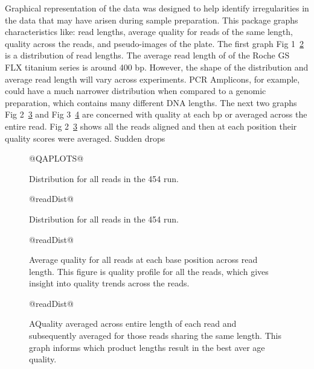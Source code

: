 \documentclass[11pt]{article}
\begin{document}
Graphical representation of the data was designed to help identify irregularities in the data that may have arisen during sample preparation.  This package graphs characteristics like: read lengths, average quality for reads of the same length, quality across the reads, and pseudo-images of the plate.
The first graph Fig 1~\ref{fig:01} is a distribution of read lengths.  The average read length of of the Roche GS FLX titanium series is around 400 bp.  However, the shape of the distribution and average read length will vary across experiments.  PCR Amplicons, for example, could have a much narrower distribution when compared to a genomic preparation, which contains many different DNA lengths.  The next two graphs Fig 2~\ref{fig:02} and Fig 3~\ref{fig:03} are concerned with quality at each bp or averaged across the entire read.  Fig 2~\ref{fig:02} shows all the reads aligned and then at each position their quality scores were averaged.  Sudden drops    

\begin{figure}
\begin{center}
@QAPLOTS@
\label{fig:01}
\caption{Distribution for all reads in the 454 run.}
\end{center}
\end{figure} 

\begin{figure}
\begin{center}
@readDist@
\label{fig:01}
\caption{Distribution for all reads in the 454 run.}
\end{center}
\end{figure}       

\begin{figure}
\begin{center}
@readDist@
\label{fig:02}
\caption{Average quality for all reads at each base position
across read length. This figure is quality profile for all the reads,
which gives insight into quality trends across the reads.}
\end{center}
\end{figure}     

\begin{figure}
\begin{center}
@readDist@
\label{fig:03}
\caption{AQuality averaged across entire length of each read and
subsequently averaged for those reads sharing the same length.
This graph informs which product lengths result in the best aver
age quality.
}
\end{center}
\end{figure}     
\end{document}
